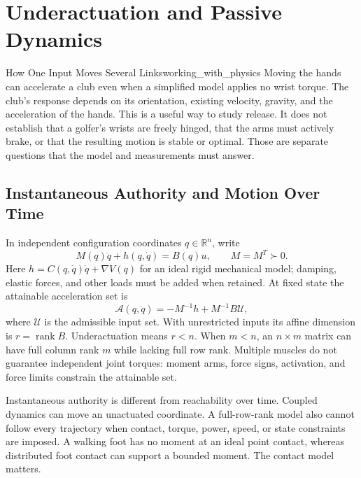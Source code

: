 \documentclass[12pt, openany]{book}
\theoremstyle{plain}
\begin{document}
\setcounter{chapter}{4}

\chapter{Underactuation and Passive Dynamics}
\label{ch:underactuation}

\begin{keyidea}{How One Input Moves Several Links}{working_with_physics}
Moving the hands can accelerate a club even when a simplified model applies
no wrist torque. The club's response depends on its orientation, existing
velocity, gravity, and the acceleration of the hands. This is a useful way to
study release. It does not establish that a golfer's wrists are freely hinged,
that the arms must actively brake, or that the resulting motion is stable or
optimal. Those are separate questions that the model and measurements must answer.
\end{keyidea}

\section{Instantaneous Authority and Motion Over Time}

In independent configuration coordinates $q\in\mathbb R^n$, write
\begin{equation}
M(q)\ddot q+h(q,\dot q)=B(q)u,\qquad M=M^T\succ0.
\end{equation}
Here $h=C(q,\dot q)\dot q+\nabla V(q)$ for an ideal rigid mechanical model;
damping, elastic forces, and other loads must be added when retained.
At fixed state the attainable acceleration set is
\begin{equation}
\mathcal A(q,\dot q)=-M^{-1}h+M^{-1}B\mathcal U,
\end{equation}
where $\mathcal U$ is the admissible input set. With unrestricted inputs its
affine dimension is $r=\operatorname{rank}B$. Underactuation means $r<n$.
When $m<n$, an $n\times m$ matrix can have full column rank $m$ while lacking
full row rank. Multiple muscles do not guarantee independent joint torques:
moment arms, force signs, activation, and force limits constrain the attainable set.

Instantaneous authority is different from reachability over time. Coupled
dynamics can move an unactuated coordinate. A full-row-rank model also cannot
follow every trajectory when contact, torque, power, speed, or state constraints
are imposed. A walking foot has no moment at an ideal point contact, whereas
distributed foot contact can support a bounded moment. The contact model matters.
\end{document}
